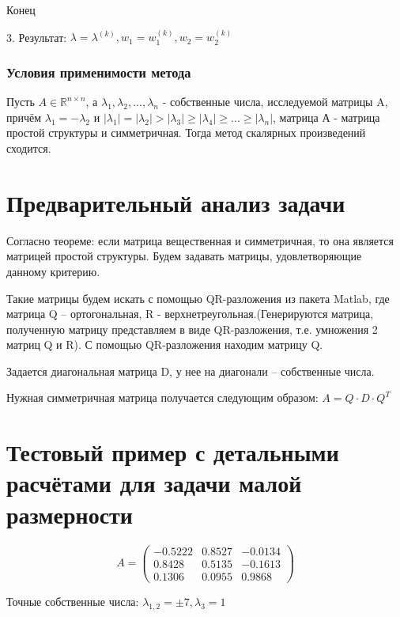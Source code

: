 \documentclass{article}
\begin{document}
	Конец
	
	3. Результат: $\lambda = \lambda^{(k)}, w_1 = w^{(k)}_{1}, w_2 = w^{(k)}_{2} $
	~\\
	
	
	
	\subsubsection{Условия применимости метода}
	Пусть $A \in \mathbb{R}^{n \times n}$, а $\lambda_1, \lambda_2,...,\lambda_n$ - собственные числа, исследуемой матрицы A, причём $\lambda_1 = -\lambda_2$ и $|\lambda_1| = |\lambda_2| > |\lambda_3| \geq |\lambda_4| \geq ... \geq |\lambda_n|$, матрица А - матрица простой структуры и симметричная. Тогда метод скалярных произведений сходится.

	
	
	\section{Предварительный анализ задачи}
	Согласно теореме: если матрица вещественная и симметричная, то она является матрицей простой структуры. Будем задавать матрицы, удовлетворяющие данному критерию.
	
	Такие матрицы будем искать с помощью QR-разложения из пакета Matlab, где матрица Q – ортогональная, R - верхнетреугольная.(Генерируются матрица, полученную матрицу представляем в виде QR-разложения, т.е. умножения 2 матриц Q и R). С помощью QR-разложения находим матрицу Q.
	
	Задается диагональная матрица D, у нее на диагонали – собственные числа. 
	
	Нужная симметричная матрица получается следующим образом:
	$A = Q \cdot D \cdot Q^T$
	
	\section{Тестовый пример с детальными расчётами для задачи малой размерности}
	  
	  
	  
	\[A =							
	\left(
	\begin{array}{ccc}
		-0.5222 & 0.8527 & -0.0134\\
		0.8428 & 0.5135 & -0.1613 \\
		0.1306 & 0.0955 & 0.9868
	\end{array}
	\right)
	\] 

	Точные собственные числа:
	$\lambda_{1,2} = \pm 7 , \lambda_3 = 1$
	
\end{document}
